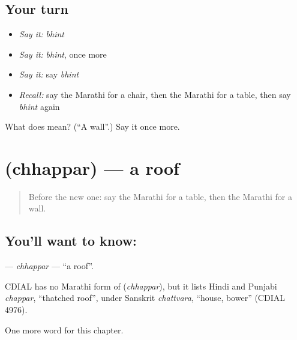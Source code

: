 \subsection*{Your turn}
\begin{itemize}
\raggedright
  \item \emph{Say it:} \emph{bhint}
  \item \emph{Say it:} \emph{bhint}, once more
  \item \emph{Say it:} say \emph{bhint}
  \item \emph{Recall:} say the Marathi for a chair, then the Marathi for a table, then say \emph{bhint} again
\end{itemize}

\begin{tcolorbox}[breakable,colback=teal!4,colframe=teal!35!black,title={Before you move on}]
What does  mean? (\textquotedblleft{}A wall\textquotedblright{}.) Say it once more.
\end{tcolorbox}
\section[\texorpdfstring{\mr{छप्पर} (chhappar)}{छप्पर (chhappar)}]{ (chhappar) — a roof}

\label{lesson:MR-C90-chhappar}



\begin{quote}
Before the new one: say the Marathi for a table, then the Marathi for a wall.
\end{quote}

\subsection*{You'll want to know: }
\textbf{} — \emph{chhappar} — \textquotedblleft{}a roof\textquotedblright{}.

\begin{cousinweb}
CDIAL has no Marathi form of \textbf{} (\emph{chhappar}), but it lists Hindi and Punjabi \emph{chappar}, \textquotedblleft{}thatched roof\textquotedblright{}, under Sanskrit \emph{chattvara}, \textquotedblleft{}house, bower\textquotedblright{} (CDIAL 4976).
\end{cousinweb}

\begin{grammarlens}[title={What you've built}]
One more word for this chapter.
\end{grammarlens}

